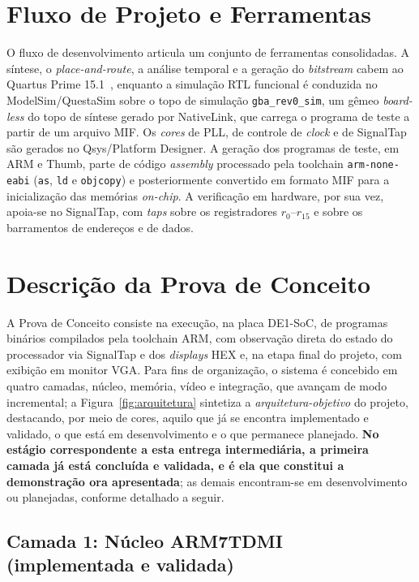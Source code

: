 \documentclass[pnumromarab,times]{politex}
\begin{document}
\section{Fluxo de Projeto e Ferramentas}
\label{sec:fluxo}

O fluxo de desenvolvimento articula um conjunto de ferramentas
consolidadas. A síntese, o \textit{place-and-route}, a análise
temporal e a geração do \textit{bitstream} cabem ao Quartus Prime
15.1~\cite{CycloneV}, enquanto a simulação RTL funcional é conduzida no
ModelSim/QuestaSim sobre o topo de simulação \texttt{gba\_rev0\_sim}, um
gêmeo \textit{board-less} do topo de síntese gerado por NativeLink, que
carrega o programa de teste a partir de um arquivo MIF. Os \textit{cores} de PLL, de controle de
\textit{clock} e de SignalTap são gerados no Qsys/Platform Designer. A
geração dos programas de teste, em ARM e Thumb, parte de código
\textit{assembly} processado pela toolchain \texttt{arm-none-eabi}
(\texttt{as}, \texttt{ld} e \texttt{objcopy}) e posteriormente
convertido em formato MIF para a inicialização das memórias
\textit{on-chip}. A verificação em hardware, por sua vez, apoia-se no
SignalTap, com \textit{taps} sobre os registradores $r_0$--$r_{15}$ e
sobre os barramentos de endereços e de dados.


\section{Descrição da Prova de Conceito}
\label{sec:poc}

A Prova de Conceito consiste na execução, na placa DE1-SoC, de
programas binários compilados pela toolchain ARM, com observação
direta do estado do processador via SignalTap e dos \textit{displays}
HEX e, na etapa final do projeto, com exibição em monitor VGA. Para
fins de organização, o sistema é concebido em quatro camadas,
núcleo, memória, vídeo e integração, que avançam de modo
incremental; a Figura~\ref{fig:arquitetura} sintetiza a
\emph{arquitetura-objetivo} do projeto, destacando, por meio de cores,
aquilo que já se encontra implementado e validado, o que está em
desenvolvimento e o que permanece planejado. \textbf{No estágio correspondente a esta entrega
intermediária, a primeira camada já está concluída e validada, e é ela
que constitui a demonstração ora apresentada}; as demais encontram-se
em desenvolvimento ou planejadas, conforme detalhado a seguir.

\subsection{Camada 1: Núcleo ARM7TDMI (implementada e validada)}
\end{document}
